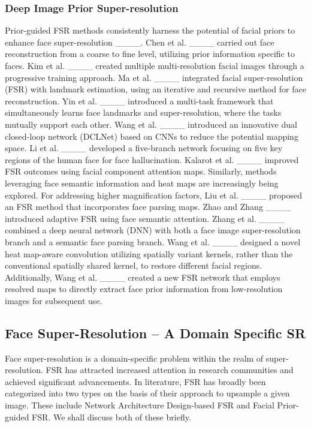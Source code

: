 \subsubsection{Deep Image Prior Super-resolution}
Prior-guided FSR methods consistently harness the potential of facial priors to enhance face super-resolution ____. Chen et al. ____ carried out face reconstruction from a coarse to fine level, utilizing prior information specific to faces. Kim et al. ____ created multiple multi-resolution facial images through a progressive training approach. Ma et al. ____ integrated facial super-resolution (FSR) with landmark estimation, using an iterative and recursive method for face reconstruction. Yin et al. ____ introduced a multi-task framework that simultaneously learns face landmarks and super-resolution, where the tasks mutually support each other. Wang et al. ____ introduced an innovative dual closed-loop network (DCLNet) based on CNNs to reduce the potential mapping space. Li et al. ____ developed a five-branch network focusing on five key regions of the human face for face hallucination. Kalarot et al. ____ improved FSR outcomes using facial component attention maps. Similarly, methods leveraging face semantic information and heat maps are increasingly being explored. For addressing higher magnification factors, Liu et al. ____ proposed an FSR method that incorporates face parsing maps. Zhao and Zhang ____ introduced adaptive FSR using face semantic attention. Zhang et al. ____ combined a deep neural network (DNN) with both a face image super-resolution branch and a semantic face parsing branch. Wang et al. ____ designed a novel heat map-aware convolution utilizing spatially variant kernels, rather than the conventional spatially shared kernel, to restore different facial regions. Additionally, Wang et al. ____ created a new FSR network that employs resolved maps to directly extract face prior information from low-resolution images for subsequent use.
\subsection{Face Super-Resolution -- A Domain Specific SR }
Face super-resolution is a domain-specific problem within the realm of super-resolution. FSR has attracted increased attention in research communities and achieved significant advancements. In literature, FSR has broadly been categorized into two types on the basis of their approach to upsample a given image. These include Network Architecture Design-based FSR and Facial Prior-guided FSR. We shall discuss both of these briefly.\\

